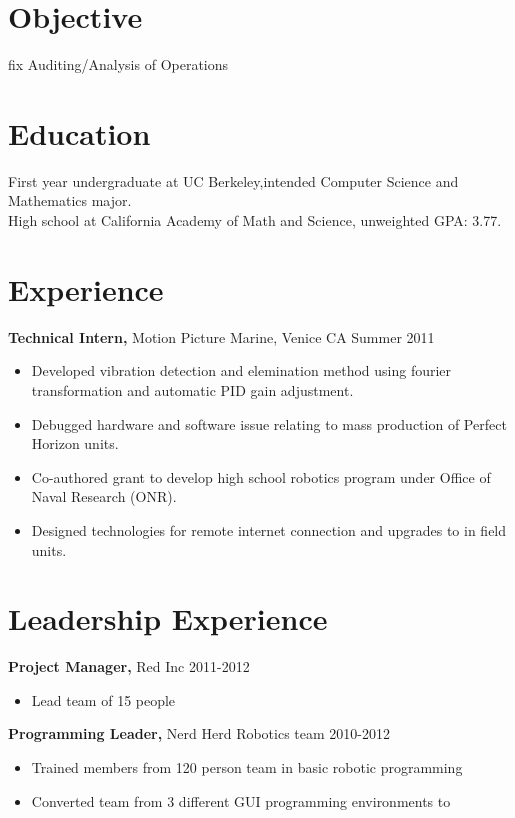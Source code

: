 \documentclass[margin]{res}
\begin{document}
\begin{resume}

\section{Objective}
fix
Auditing/Analysis of Operations

\section{Education}
First year undergraduate at UC Berkeley,intended Computer Science and Mathematics major. \\
High school at California Academy of Math and Science, unweighted GPA: 3.77.


\section{Experience}
{\bf Technical Intern,} Motion Picture Marine, Venice CA \hfill Summer 2011
\begin{itemize} \itemsep -2pt  %
  \item Developed vibration detection and elemination method using fourier transformation and automatic PID gain adjustment.
  \item Debugged hardware and software issue relating to mass production of Perfect Horizon units.
  \item Co-authored grant to develop high school robotics program under Office of Naval Research (ONR).
  \item Designed technologies for remote internet connection and upgrades to in field units.
\end{itemize}


\section{Leadership Experience}
{\bf Project Manager,} Red Inc \hfill 2011-2012
\begin{itemize} \itemsep -2pt
  \item Lead team of 15 people
\end{itemize}

{\bf Programming Leader,} Nerd Herd Robotics team \hfill 2010-2012
\begin{itemize} \itemsep -2pt
  \item Trained members from 120 person team in basic robotic programming
  \item Converted team from 3 different GUI programming environments to
\end{itemize}


\end{resume}
\end{document}
